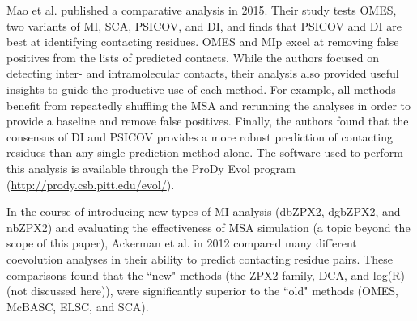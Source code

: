 \par Mao et al. published a comparative analysis in 2015.\cite{Mao2015} Their study tests OMES, two variants of MI, SCA, PSICOV, and DI, and finds that PSICOV and DI are best at identifying contacting residues. OMES and MIp excel at removing false positives from the lists of predicted contacts. While the authors focused on detecting inter- and intramolecular contacts, their analysis also provided useful insights to guide the productive use of each method. For example, all methods benefit from repeatedly shuffling the MSA and rerunning the analyses in order to provide a baseline and remove false positives. Finally, the authors found that the consensus of DI and PSICOV provides a more robust prediction of contacting residues than any single prediction method alone. The software used to perform this analysis is available through the ProDy Evol program (\url{http://prody.csb.pitt.edu/evol/}).\cite{Bakan2011}
\par In the course of introducing new types of MI analysis (dbZPX2, dgbZPX2, and nbZPX2) and evaluating the effectiveness of MSA simulation (a topic beyond the scope of this paper), Ackerman et al. in 2012 compared many different coevolution analyses in their ability to predict contacting residue pairs.\cite{Ackerman2012} These comparisons found that the ``new" methods (the ZPX2 family, DCA, and log(R) (not discussed here)), were significantly superior to the ``old" methods (OMES, McBASC, ELSC, and SCA).
